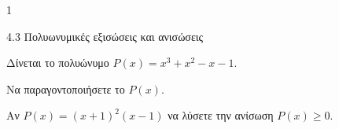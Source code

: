 \begin{ylh}{1}
\item 4.3 Πολυωνυμικές εξισώσεις και ανισώσεις
\end{ylh}
Δίνεται το πολυώνυμο $P(x) = x^3 + x^2 - x - 1$.
\begin{alist}
\item Να παραγοντοποιήσετε το $P(x)$.
\item Αν $P(x) = (x + 1)^2(x - 1)$ να λύσετε την ανίσωση $P(x) \ge 0$.
\end{alist}

